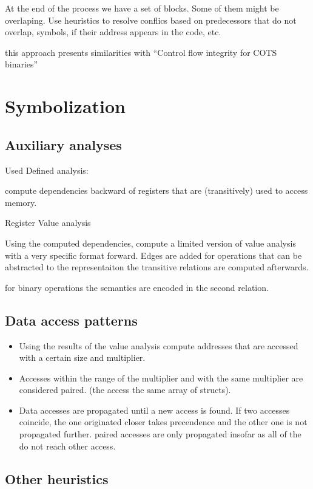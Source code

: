 \documentclass[]{llncs}
\begin{document}
At the end of the process we have a set of blocks. Some of them might be overlaping.
Use heuristics to resolve conflics
based on predecessors that do not overlap, symbols, if their address appears in the code,
etc.

this approach presents similarities with ``Control flow integrity for COTS binaries''\cite{}

\section{Symbolization}
\subsection{Auxiliary analyses}
Used Defined analysis:

compute dependencies backward of registers that are (transitively) used to access
memory.


Register Value analysis

Using the computed dependencies, compute a limited version of value analysis with a
very specific format forward.
Edges are added for operations that can be abstracted to the representaiton
the transitive relations are computed afterwards.

for binary operations the semantics are encoded in the second relation.



\subsection{Data access patterns}
\begin{itemize}
\item Using the results of the value analysis compute addresses that are accessed with
a certain size and multiplier.
\item Accesses within the range of the multiplier and with the same multiplier are considered
paired. (the access the same array of structs).
\item Data accesses are propagated until a new access is found.
If two accesses coincide, the one originated closer takes precendence and the
other one is not propagated further.
paired accesses are only propagated insofar as all of the do not reach other access.
\end{itemize}
\subsection{Other heuristics}
\end{document}
